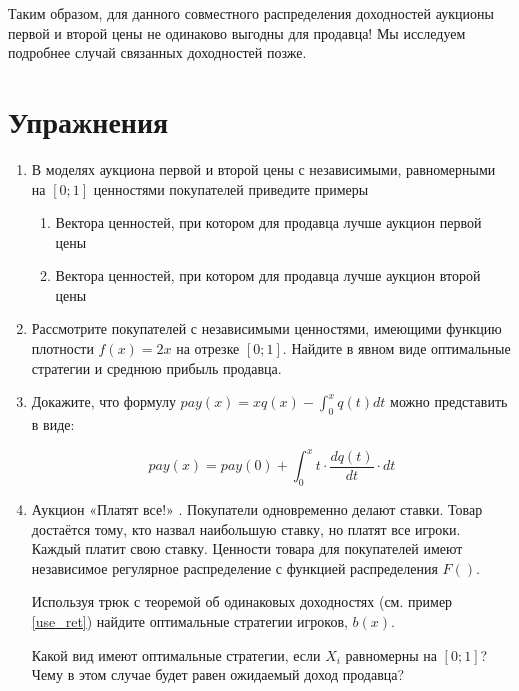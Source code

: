 Таким образом, для данного совместного распределения доходностей аукционы первой и второй цены не одинаково выгодны для продавца! Мы исследуем подробнее случай связанных доходностей позже.



\section{Упражнения}


\begin{enumerate}
\item В моделях аукциона первой и второй цены с независимыми, равномерными на $ [0;1] $ ценностями покупателей приведите примеры
\begin{enumerate}
\item Вектора ценностей, при котором для продавца лучше аукцион первой цены
\item Вектора ценностей, при котором для продавца лучше аукцион второй цены
\end{enumerate}


\item Рассмотрите покупателей с независимыми ценностями, имеющими функцию плотности $ f(x)=2x $ на отрезке $ [0;1] $. Найдите в явном виде оптимальные стратегии и среднюю прибыль продавца.



\item Докажите, что формулу $ pay(x)=xq(x)-\int_{0}^{x}q(t)dt$ можно представить в виде:

\begin{equation}
pay(x)=pay(0)+\int_{0}^{x}t \cdot \frac{dq(t)}{dt}\cdot dt
\end{equation}



\item Аукцион «Платят все!» . Покупатели одновременно делают ставки. Товар достаётся тому, кто назвал наибольшую ставку, но платят все игроки. Каждый платит свою ставку. Ценности товара для покупателей имеют независимое регулярное распределение с функцией распределения $ F() $.

Используя трюк с теоремой об одинаковых доходностях (см. пример \ref{use_ret}) найдите оптимальные стратегии игроков, $ b(x) $.

Какой вид имеют оптимальные стратегии, если $ X_{i} $ равномерны на $ [0;1] $? Чему в этом случае будет равен ожидаемый доход продавца?





\end{enumerate}
